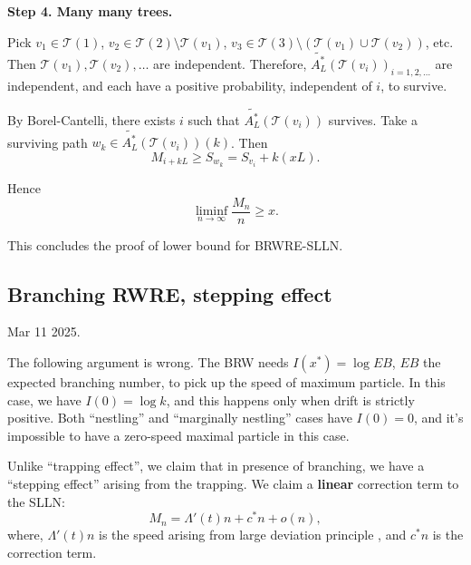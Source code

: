 \textbf{Step 4. Many many trees.}

Pick $v_1 \in \mathcal{T}(1)$, $v_2 \in \mathcal{T}(2) \setminus \mathcal{T}(v_1)$, $v_3 \in \mathcal{T}(3) \setminus \left( \mathcal{T}(v_1) \cup \mathcal{T}(v_2) \right) $, etc. Then $\mathcal{T}(v_1), \mathcal{T}(v_2), \ldots$ are independent. Therefore, $\widetilde{A^*_L}(\mathcal{T}(v_i))_{i= 1, 2, \ldots}$ are independent, and each have a positive probability, independent of $i$, to survive.

By Borel-Cantelli, there exists $i$ such that $\widetilde{A^*_L}(\mathcal{T}(v_i))$ survives. Take a surviving path $w_k \in \widetilde{A^*_L}(\mathcal{T}(v_i))(k)$. Then
\[
	M_{i + kL} \ge S_{w_k} = S_{v_i} + k (xL)
.\] 

Hence
\[
	\liminf_{n \to \infty } \frac{M_n}{n} \ge x
.\] 

This concludes the proof of lower bound for BRWRE-SLLN.


\subsection{Branching RWRE, stepping effect}

Mar 11 2025.

\begin{tcolorbox}[colback=cyan!5!white, colframe=cyan!75!black, title=Wrong argument]
	The following argument is wrong. The BRW needs $I(x^*) = \log EB$, $EB$ the expected branching number, to pick up the speed of maximum particle. In this case, we have $I(0) = \log k$, and this happens only when drift is strictly positive. Both ``nestling'' and ``marginally nestling'' cases have $I(0) = 0$, and it's impossible to have a zero-speed maximal particle in this case.
\end{tcolorbox}

Unlike ``trapping effect'', we claim that in presence of branching, we have a ``stepping effect'' arising from the trapping. We claim a \textbf{linear} correction term to the SLLN:
\[
M_n = \Lambda'(t) n + c^* n + o(n),
\]
where, $\Lambda'(t) n$ is the speed arising from large deviation principle \autocite{cometsQuenchedAnnealed2003}, and $c^* n$ is the correction term.

